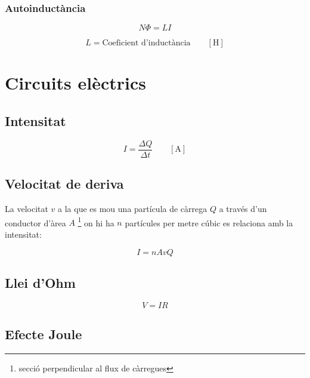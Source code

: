 \subsubsection{Autoinductància}
\label{ssub:autoinductancia}

\begin{equation}
    N\Phi = LI
\end{equation}

\begin{equation}
    L = \text{Coeficient d'inductància} \qquad \left[ \si{\henry} \right]
\end{equation}

\section{Circuits elèctrics}
\label{sec:circuits_electrics}


\subsection{Intensitat}
\label{sub:intensitat}

\begin{equation}
    I = \frac{\Delta Q}{\Delta t} \qquad \left[\si{\ampere}\right]
\end{equation}

\subsection{Velocitat de deriva}
\label{sub:velocitat_de_deriva}
La velocitat $v$ a la que es mou una partícula de càrrega $Q$ a través d'un
conductor d'àrea $A$ \footnote{secció perpendicular al flux de càrregues} on
hi ha $n$ partícules per metre cúbic es relaciona amb la intensitat:

\begin{equation}
    I = nAvQ
\end{equation}

\subsection{Llei d'Ohm}
\label{sub:llei_d_ohm}

\begin{equation}
    V = IR
\end{equation}

\subsection{Efecte Joule}
\label{sub:efecte_joule}

